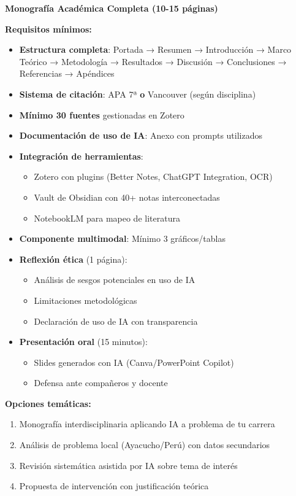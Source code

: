 \documentclass[12pt,a4paper]{yaac-luatex}
\begin{document}
	\begin{tcolorbox}[
		enhanced,
		colback=accentcolor!20,
		colframe=accentcolor,
		arc=3pt,
		boxrule=2pt,
		breakable
		]
		\textbf{Monografía Académica Completa (10-15 páginas)}
		
		\textbf{Requisitos mínimos:}
		\begin{itemize}[leftmargin=*, itemsep=0.2cm]
			\item \textbf{Estructura completa}: Portada → Resumen → Introducción → Marco Teórico → Metodología → Resultados → Discusión → Conclusiones → Referencias → Apéndices
			\item \textbf{Sistema de citación}: APA 7ª \textbf{o} Vancouver (según disciplina)
			\item \textbf{Mínimo 30 fuentes} gestionadas en Zotero
			\item \textbf{Documentación de uso de IA}: Anexo con prompts utilizados
			\item \textbf{Integración de herramientas}:
			\begin{itemize}
				\item Zotero con plugins (Better Notes, ChatGPT Integration, OCR)
				\item Vault de Obsidian con 40+ notas interconectadas
				\item NotebookLM para mapeo de literatura
			\end{itemize}
			\item \textbf{Componente multimodal}: Mínimo 3 gráficos/tablas
			\item \textbf{Reflexión ética} (1 página):
			\begin{itemize}
				\item Análisis de sesgos potenciales en uso de IA
				\item Limitaciones metodológicas
				\item Declaración de uso de IA con transparencia
			\end{itemize}
			\item \textbf{Presentación oral} (15 minutos):
			\begin{itemize}
				\item Slides generados con IA (Canva/PowerPoint Copilot)
				\item Defensa ante compañeros y docente
			\end{itemize}
		\end{itemize}
		
		\textbf{Opciones temáticas:}
		\begin{enumerate}[leftmargin=*, itemsep=0.1cm]
			\item Monografía interdisciplinaria aplicando IA a problema de tu carrera
			\item Análisis de problema local (Ayacucho/Perú) con datos secundarios
			\item Revisión sistemática asistida por IA sobre tema de interés
			\item Propuesta de intervención con justificación teórica
		\end{enumerate}
	\end{tcolorbox}
	
\end{document}
